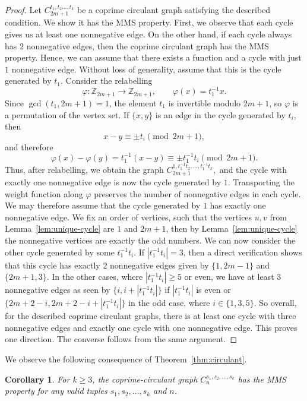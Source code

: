 \documentclass[12pt,UKenglish]{amsart}
\theoremstyle{plain}
\newtheorem{cor}[thm]{Corollary}
\theoremstyle{definition}
\theoremstyle{remark}
\begin{document}
\begin{proof}

 Let $C_{2m+1}^{t_1,t_2\dots ,t_k}$ be a coprime circulant graph satisfying the described condition. We show it has the MMS property.
 First, we observe that each cycle gives us at least one nonnegative edge.
 On the other hand, if each cycle always has $2$ nonnegative edges, then the coprime circulant graph has the MMS property.
 Hence, we can assume that there exists a function and a cycle with just $1$ nonnegative edge.
 Without loss of generality, assume that this is the cycle generated by $t_1$.
 Consider the relabelling
\[
\varphi : \mathbb{Z}_{2m+1} \to \mathbb{Z}_{2m+1}, \qquad \varphi(x)=t_1^{-1}x.
\]
Since $\gcd(t_1,2m+1)=1$, the element $t_1$ is invertible modulo $2m+1$, so
$\varphi$ is a permutation of the vertex set.
 If $\{x,y\}$ is an edge in the cycle
generated by $t_i$, then
\[
x-y \equiv \pm t_i \pmod{2m+1},
\]
and therefore
\[
\varphi(x)-\varphi(y)=t_1^{-1}(x-y)\equiv \pm t_1^{-1}t_i \pmod{2m+1}.
 \]
Thus, after relabelling, we obtain the graph
\(
C_{2m+1}^{1,t_1^{-1}t_2,\dots,t_1^{-1}t_k},
\)
and the cycle with exactly one nonnegative edge is now the cycle generated by $1$.
 Transporting the weight function along $\varphi$ preserves the number of
nonnegative edges in each cycle.
 We may therefore assume that the cycle generated by $1$ has exactly one
nonnegative edge.
 We fix an order of vertices, such that the vertices $u,v$ from Lemma~\ref{lem:unique-cycle} are $1$ and $2m+1$, then by Lemma~\ref{lem:unique-cycle} the nonnegative vertices are exactly the odd numbers.
 We can now consider the other cycle generated by some $t_1^{-1}t_i$.
 If $|t_1^{-1}t_i|=3$, then a direct verification shows that this cycle has exactly $2$ nonnegative edges given by $\{1,2m-1\}$ and $\{2m+1,3\}$.
 In the other cases, where $|t_1^{-1}t_i|\ge5$ or even, we have at least $3$ nonnegative edges as seen by $\{i,i+|t_1^{-1}t_i|\}$ if $|t_1^{-1}t_i|$ is even or $\{2m+2-i,2m+2-i+|t_1^{-1}t_i|\}$ in the odd case, where $i\in\{1,3,5\}$.
 So overall, for the described coprime circulant graphs, there is at least one cycle with three nonnegative edges and exactly one cycle with one nonnegative edge.
 This proves one direction. The converse follows from the same argument.
\end{proof}
We observe the following consequence of Theorem~\ref{thm:circulant}.
 \begin{cor}\label{cor:circulant}
  For $k\ge3$, the coprime-circulant graph $C_n^{s_1,s_2,\dots ,s_k}$ has the MMS property for any valid tuples $s_1,s_2,\dots ,s_k$ and $n$.
 \end{cor}
\end{document}
